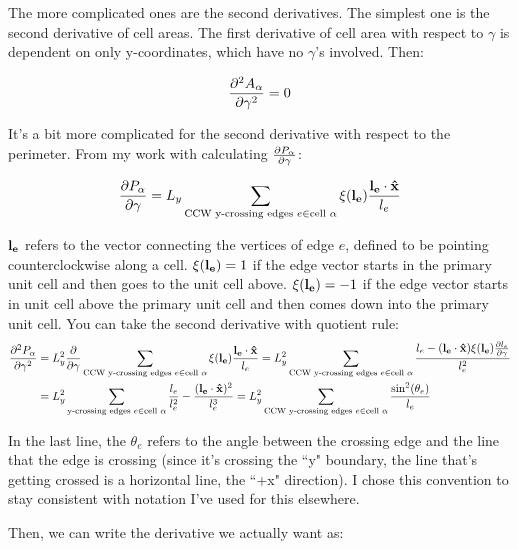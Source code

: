 \documentclass[12pt,a4paper]{article}
\begin{document}
The more complicated ones are the second derivatives. The simplest one is the second derivative of cell areas. The first derivative of cell area with respect to $\gamma$ is dependent on only y-coordinates, which have no $\gamma$'s involved. Then:

\begin{equation}
	\label{eqn: dAdgammadgamma}
	\pdv[2]{A_\alpha}{\gamma}  = 0
\end{equation}

It's a bit more complicated for the second derivative with respect to the perimeter. From my work with calculating $\pdv{P_\alpha}{\gamma}$:

\begin{align}
	\label{eqn: dPdLx}
	\pdv{P_\alpha}{\gamma} =  L_y \sum\limits_{ \text{CCW y-crossing edges } e \in \text{cell } \alpha} \xi(\vb{l_e}) \frac{\vb{l_e}\cdot \vu{x}}{l_e} 
\end{align}

$\vb{l_e}$ refers to the vector connecting the vertices of edge $e$, defined to be pointing counterclockwise along a cell. $\xi(\vb{l_e}) = 1$ if the edge vector starts in the primary unit cell and then goes to the unit cell above. $\xi(\vb{l_e}) = -1$ if the edge vector starts in unit cell above the primary unit cell and then comes down into the primary unit cell.  You can take the second derivative with quotient rule:
\begin{align}
	\label{eqn: dPdLxdLx}
	\pdv[2]{P_\alpha}{\gamma} &= L_y^2\pdv{\gamma} \sum\limits_{ \text{CCW y-crossing edges } e \in \text{cell } \alpha} \xi(\vb{l_e})\frac{\vb{l_e}\cdot \vu{x}}{l_e} = L_y^2\sum\limits_{ \text{CCW y-crossing edges } e \in \text{cell } \alpha}  \frac{l_e - (\vb{l_e}\cdot \vu{x}) \xi(\vb{l_e})\pdv{l_e}{\gamma}}{l_e^2}\\ &= L_y^2\sum\limits_{ \text{y-crossing edges } e \in \text{cell } \alpha}  \frac{l_e}{l_e^2} - \frac{(\vb{l_e}\cdot \vu{x})^2}{l_e^3}
	= L_y^2 \sum\limits_{ \text{CCW y-crossing edges } e \in \text{cell } \alpha} \frac{\sin^2(\theta_{e})}{l_e}
\end{align}

In the last line, the $\theta_e$ refers to the angle between the crossing edge and the line that the edge is crossing (since it's crossing the ``y" boundary, the line that's getting crossed is a horizontal line, the ``+x" direction). I chose this convention to stay consistent with notation I've used for this elsewhere. 

Then, we can write the derivative we actually want as:
\end{document}
